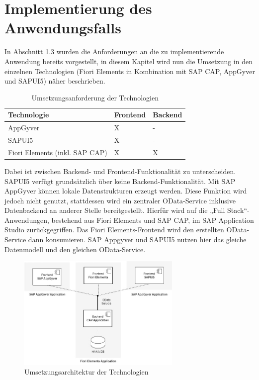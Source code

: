 
\chapter{Implementierung des Anwendungsfalls} \label{IM}


In Abschnitt 1.3 wurden die Anforderungen an die zu implementierende Anwendung bereits vorgestellt, in diesem Kapitel wird nun die Umsetzung in den einzelnen Technologien (Fiori Elements in Kombination mit SAP CAP, AppGyver und SAPUI5) näher beschrieben. 

\begin{table}[htbp]
  \centering
	\begin{tabular}{|l|l|l|} 
	\hline 
	\rowcolor{gray!40}
     Technologie&Frontend&Backend\\
	\hline  
	AppGyver&X&-\\
	\hline
	SAPUI5&X&-\\
	\hline
	Fiori Elements (inkl. SAP CAP)&X&X\\
	\hline
	\end{tabular}
  \caption{Umsetzungsanforderung der Technologien} 
\end{table}

Dabei ist zwischen Backend- und Frontend-Funktionalität zu unterscheiden. SAPUI5 verfügt grundsätzlich über keine Backend-Funktionalität. Mit SAP AppGyver können lokale Datenstrukturen erzeugt werden. Diese Funktion wird jedoch nicht genutzt, stattdessen wird ein zentraler OData-Service inklusive Datenbackend an anderer Stelle bereitgestellt. Hierfür wird auf die „Full Stack“-Anwendungen, bestehend aus Fiori Elements und SAP CAP, im SAP Application Studio zurückgegriffen. Das Fiori Elements-Frontend wird den erstellten OData-Service dann konsumieren. SAP Appgyver und SAPUI5 nutzen hier das gleiche Datenmodell und den gleichen OData-Service. 

\begin{figure}[htbp]
 \centering
 \includegraphics[width=0.7\textwidth]{Bilder/architecture/apps_architektur.jpg}
 \caption{Umsetzungsarchitektur der Technologien}
\end{figure}

